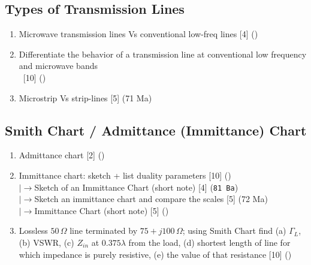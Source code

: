 \documentclass[12pt]{article}
\newcommand{\lb}{\\$\left|\rightarrow\right.$}
\newcommand{\enter}{\\\textcolor{white}{1}}
\begin{document}
  \subsection{Types of Transmission Lines}
    \begin{enumerate}[topsep=0pt, noitemsep]
      \item Microwave transmission lines Vs conventional low-freq lines \hfill [4] ()
      \item Differentiate the behavior of a transmission line at conventional low frequency and microwave bands \enter\hfill [10] ()
      \item Microstrip Vs strip-lines \hfill [5] (71 Ma)
    \end{enumerate}

  \subsection{Smith Chart / Admittance (Immittance) Chart}
    \begin{enumerate}[topsep=0pt, noitemsep]
      \item Admittance chart \hfill [2] ()
      \item Immittance chart: sketch + list duality parameters \hfill [10] ()
        \lb Sketch of an Immittance Chart (short note) \hfill [4] (\texttt{81 Ba})
        \lb Sketch an immittance chart and compare the scales \hfill [5] (72 Ma)
        \lb Immittance Chart (short note) \hfill [5] ()
      \item Lossless $50\,\Omega$ line terminated by $75{+}j100\,\Omega$; using Smith Chart find (a) $\Gamma_L$, (b) VSWR, (c) $Z_{in}$ at $0.375\lambda$ from the load, (d) shortest length of line for which impedance is purely resistive, (e) the value of that resistance \hfill [10] ()
    \end{enumerate}
\end{document}
